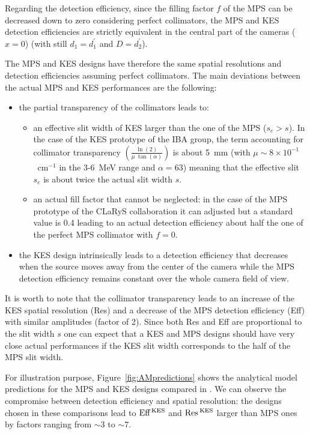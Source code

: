 \documentclass[a4paper,english]{article}
\newcommand{\answ}[1]{\todo[linecolor=blue,backgroundcolor=blue!25,bordercolor=blue]{#1}}
\begin{document}
Regarding the detection efficiency, since the filling factor $f$ of the MPS can be decreased down to zero considering perfect collimators, the MPS and KES detection efficiencies are strictly equivalent in the central part of the cameras ($x=0$) (with still $d_1=d_1^{'}$ and $D=d_2^{'}$).

The MPS and KES designs have therefore the same spatial resolutions and detection efficiencies assuming perfect collimators. The main deviations between the actual MPS and KES performances are the following: 
\begin{itemize}
	\item the partial transparency of the collimators leads to:
	\begin{itemize}
		\item an effective slit width of KES larger than the one of the MPS ($s_e>s$). In the case of the KES prototype of the IBA group, the term accounting for collimator transparency $\left(\frac{\ln(2)}{\mu~\tan(\alpha)}\right)$ is about 5~mm (with $\mu\sim 8\times10^{-1}$~cm$^{-1}$ in the 3-6~MeV range and $\alpha=63$\textdegree) meaning that the effective slit $s_e$ is about twice the actual slit width $s$.
		\item an actual fill factor that cannot be neglected: in the case of the MPS prototype of the CLaRyS collaboration it can adjusted but a standard value is 0.4 leading to an actual detection efficiency about half the one of the perfect MPS collimator with $f=0$. 
	\end{itemize}
	\item the KES design intrinsically leads to a detection efficiency that decreases when the source moves away from the center of the camera while the MPS detection efficiency remains constant over the whole camera field of view.
\end{itemize}
It is worth to note that the collimator transparency leads to an increase of the KES spatial resolution (Res) and a decrease of the MPS detection efficiency (Eff) with similar amplitudes (factor of 2). Since both Res and Eff are proportional to the slit width $s$ one can expect that a KES and MPS designs should have very close actual performances if the KES slit width corresponds to the half of the MPS slit width. 

For illustration purpose, Figure~\ref{fig:AMpredictions} \answ{Figure to be improved if we think it is interesting} shows the analytical model predictions for the MPS and KES designs compared in \citep{Smeets2016, Lin2017, Park2017}. We can observe the compromise between detection efficiency and spatial resolution: the designs chosen in these comparisons lead to $\textrm{Eff}\,_{}^{\textrm{KES}}$ and $\textrm{Res}\,_{}^{\textrm{KES}}$ larger than MPS ones by factors ranging from $\sim3$ to $\sim7$. 
\end{document}
